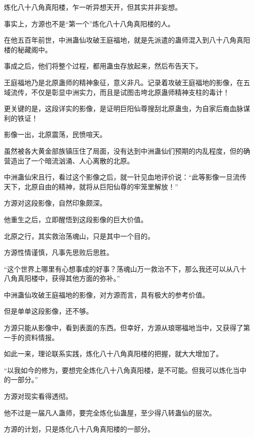 
\begin{this_body}



炼化八十八角真阳楼，乍一听异想天开，但其实并非妄想。

事实上，方源也不是“第一个”炼化八十八角真阳楼的人。

在他五百年前世，中洲蛊仙攻破王庭福地，就是先派遣的蛊师混入到八十八角真阳楼的秘藏阁中。

事成之后，他们将整个过程，都用蛊虫存放起来，然后布告天下。

王庭福地乃是北原蛊师的精神象征，意义非凡。记录着攻破王庭福地的影像，在五域流传，不仅是彰显中洲实力，而且是试图击垮北原蛊师精神支柱的毒计！

更关键的是，这段详实的影像，是证明巨阳仙尊搜刮北原蛊虫，为自家后裔血脉谋利的铁证！

影像一出，北原震荡，民愤喧天。

虽然被各大黄金部族镇压住了局面，没有达到中洲蛊仙们预期的内乱程度，但的确营造出了一个暗流汹涌、人心离散的北原。

中洲蛊仙宋且行，看过这个影像之后，就一针见血地评价说：“此等影像一旦流传天下，北原自由的精神，就将从巨阳仙尊的牢笼里解放！”

方源对这段影像，自然印象颇深。

他重生之后，立即醒悟到这段影像的巨大价值。

北原之行，其实救治荡魂山，只是其中一个目的。

方源性情谨慎，凡事先思败后思胜。

“这个世界上哪里有心想事成的好事？荡魂山万一救治不下，那么我还可以从八十八角真阳楼中，获得其他方面的弥补。”

中洲蛊仙攻破王庭福地的影像，对方源而言，具有极大的参考价值。

但是单单这段影像，还不够。

方源只能从影像中，看到表面的东西。但幸好，方源从琅琊福地当中，又获得了第一手的资料情报。

如此一来，理论联系实践，炼化八十八角真阳楼的把握，就大大增加了。

“以我如今的修为，要想完全炼化八十八角真阳楼，是不可能。但我可以炼化当中的一部分。”

方源对现实看得透彻。

他不过是一届凡人蛊师，要完全炼化仙蛊屋，至少得八转蛊仙的层次。

方源的计划，只是炼化八十八角真阳楼的一部分。


\end{this_body}
